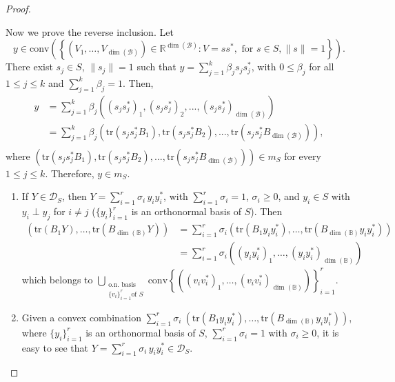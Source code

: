 \documentclass[10pt,a4paper]{amsart}
\def\DS{\mathcal{D}_S}
\def\R{\mathbb R}
\def\calB{\mathcal B}
\def\tr{\text{tr}}
\begin{document}
\begin{proof}
\begin{enumerate}
	Now we prove the reverse inclusion. Let 
	\[y\in \text{conv} \left(\left\{(V_1, \dots,V_{\dim(\calB)})\in\R^{\dim(\calB)}:V=s s^*, \text{ for } s\in S, \|s\|=1  \right\} \right).\] 
	There exist $s_j\in S$, $\|s_j\|=1$ such that 
	$	y = \sum_{j=1}^{k}\beta_js_js_j^*$,
	with $0\leq \beta_j$ for all $1\leq j\leq k$ and $\sum_{j=1}^{k}\beta_j=1$. Then,
	\begin{align*}
		y& = \sum_{j=1}^{k}\beta_j\left( (s_js_j^*)_1,(s_js_j^*)_2,..., (s_js_j^*)_{\dim(\calB)}\right) \\
		& = \sum_{j=1}^{k}\beta_j\left( \tr(s_js_j^*B_1),\tr(s_js_j^*B_2),..., \tr(s_js_j^*B_{\dim(\calB)})\right),\\
	\end{align*}
		where $\left( \tr(s_js_j^*B_1),\tr(s_js_j^*B_2),..., \tr(s_js_j^*B_{\dim(\calB)})\right)\in m_S$ for every $1\leq j\leq k$. Therefore, $y\in m_S$.
	\end{enumerate}
 
	\begin{enumerate}
		\item[\ref{item4Prop1} $\Rightarrow$ \ref{item3Prop1}.]  If $Y\in \mathcal{D}_S$, then $Y=\sum_{i=1}^r \sigma_i\, y_iy_i^*$, with $\sum_{i=1}^r\sigma_i=1$, $\sigma_i\geq 0$, and $y_i\in S$ with $y_i\perp y_j$ for $i\neq j$ ($\{y_i\}_{i=1}^r$ is an orthonormal basis of $S$). Then 
	\begin{equation*}\begin{split}
			(\tr(B_1 Y),\dots,\tr(B_{\dim(\mathbb{B})} Y))&=\sum_{i=1}^r\sigma_i \left(\tr(B_1y_iy_i^*),\dots ,\tr(B_{\dim(\mathbb{B})} y_iy_i^*)\right)\\
			&=	\sum_{i=1}^r\sigma_i \left((y_iy_i^*)_1,\dots ,(y_iy_i^*)_{\dim(\mathbb{B})}\right)
		\end{split}
	\end{equation*}
	which belongs to $\mathop{\bigcup}\limits_{\substack{\text{o.n. basis}  \\
			\{v_i\}_{i=1}^{r} \text{of } S}}
	\text{conv}\left\{ \left(\left(v_i v_i^*\right)_1,\dots, \left(v_i v_i^*\right)_{{\dim(\mathbb{B})}} \right)  \right\}_{i=1}^{r}$.
	
	\item[\ref{item3Prop1} $\Rightarrow$ \ref{item4Prop1}.] Given a convex combination $ \sum_{i=1}^r \sigma_i\ \left(\tr(B_1 y_iy_i^*),\dots,\tr(B_{\dim(\mathbb{B})} y_iy_i^*) \right)$, where $\{y_i\}_{i=1}^r$ is  an orthonormal basis of $S$, $\sum_{i=1}^r\sigma_i=1$ with $\sigma_i\geq 0$, it is easy to see that $Y=\sum_{i=1}^r \sigma_i \, y_iy_i^*\in\DS$.  
 

\end{enumerate}
\end{proof}
\end{document}
